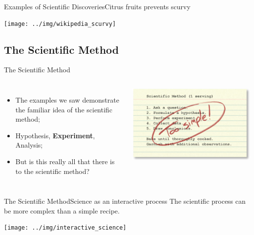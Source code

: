 \begin{frame}{Examples of Scientific Discoveries}{Citrus fruits prevents scurvy}
  \begin{center}
    \texttt{[image: ../img/wikipedia\_scurvy]}
  \end{center}
\end{frame}

\subsection{The Scientific Method}
\begin{frame}{The Scientific Method}{}
  \begin{columns}
    \begin{itemize}
      \item The examples we saw demonstrate the familiar idea of the scientific method;
      \bigskip

      \item Hypothesis, {\bf Experiment}, Analysis;
      \bigskip

      \item But is this really all that there is to the scientific method?
    \end{itemize}
      \includegraphics[width=1\textwidth]{../img/scientific_method_simple}
  \end{columns}
\end{frame}

\begin{frame}{The Scientific Method}{Science as an interactive process}
  The scientific process can be more complex than a simple recipe.
  \begin{center}
    \texttt{[image: ../img/interactive\_science]}
  \end{center}
\end{frame}


